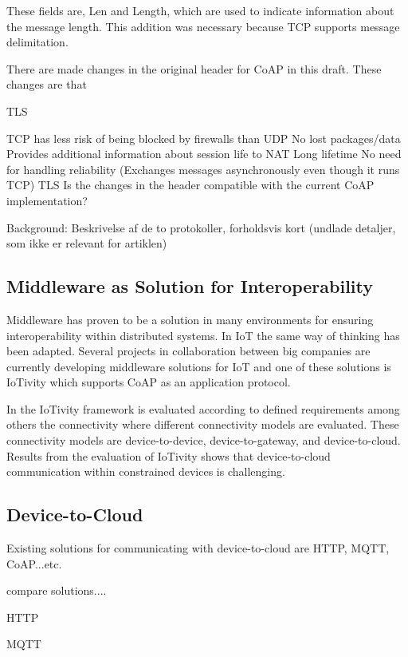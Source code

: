 These fields are, Len and Length, which are used to indicate information about the message length.  
This addition was necessary because TCP supports message delimitation.


There are made changes in the original header for CoAP in this draft. These changes are that 

TLS

TCP has less risk of being blocked by firewalls than UDP
No lost packages/data
Provides additional information about session life to NAT
Long lifetime
No need for handling reliability
(Exchanges messages asynchronously even though it runs TCP)
TLS
Is the changes in the header compatible with the current CoAP implementation?


Background: Beskrivelse af de to protokoller, forholdsvis kort (undlade detaljer, som ikke er relevant for artiklen)





\subsection{Middleware as Solution for Interoperability}
Middleware has proven to be a solution in many environments for ensuring interoperability within distributed systems. In IoT the same way of thinking has been adapted. 
Several projects in collaboration between big companies are currently developing  middleware solutions for IoT and one of these solutions is IoTivity which supports CoAP as an application protocol.
 
In \cite{interoperabilityChallenge} the IoTivity framework is evaluated according to defined requirements among others the connectivity where different connectivity models are evaluated. These connectivity models are device-to-device, device-to-gateway, and device-to-cloud. Results from the evaluation of IoTivity shows that device-to-cloud communication within constrained devices is challenging.

\subsection{Device-to-Cloud}
Existing solutions for communicating with device-to-cloud are HTTP, MQTT, CoAP...etc.

compare solutions....


HTTP 

MQTT



